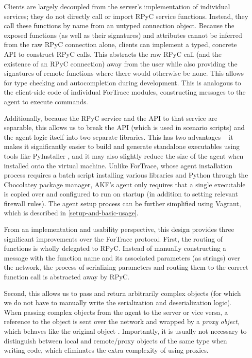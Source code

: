 \documentclass[letterpaper,12pt]{report}
\begin{document}
Clients are largely decoupled from the server's implementation of
individual services; they do not directly call or import RPyC service
functions. Instead, they call these functions by name from an untyped
connection object. Because the exposed functions (as well as their
signatures) and attributes cannot be inferred from the raw RPyC
connection alone, clients can implement a typed, concrete API to
construct RPyC calls. This abstracts the raw RPyC call (and the
existence of an RPyC connection) away from the user while also providing
the signatures of remote functions where there would otherwise be none.
This allows for type checking and autocompletion during development.
This is analogous to the client-side code of individual ForTrace
modules, constructing messages to the agent to execute commands.

Additionally, because the RPyC service and the API to that service are
separable, this allows us to break the API (which is used in scenario
scripts) and the agent logic itself into two separate libraries. This
has two advantages -- it makes it significantly easier to build and
generate standalone executables using tools like PyInstaller
\cite{PyinstallerPyinstaller2025}, and it may also slightly reduce
the size of the agent when installed onto the virtual machine. Unlike
ForTrace, whose agent installation process requires a batch script
installing various libraries and Python through the Chocolatey package
manager, AKF's agent only requires that a single executable is copied
over and configured to run on startup (in addition to setting relevant
firewall rules). The agent setup process can be further simplified using
Vagrant, which is described in \autoref{setup-and-basic-usage}.

From an implementation and usability perspective, this design provides
three significant improvements over the ForTrace protocol. First, the
routing of functions is wholly delegated to RPyC. Instead of manually
constructing a message with the function name and its associated
parameters (as strings) over the network, the process of serializing
parameters and routing them to the correct function call is abstracted
away by RPyC.

Second, this allows us to pass and return arbitrarily complex objects
(for which we do not have to manually write the serialization and
deserialization logic). When passing complex objects from the agent to
the server or vice versa, a reference to the object is sent over the
network and wrapped by a \emph{proxy object}, which behaves like the
original object \cite{TheoryOperationRPyC}. Importantly, it is
usually not necessary to distinguish between local and remote/proxy
objects of the same type when writing code, which eliminates the extra
complexity of using proxies.
\end{document}
